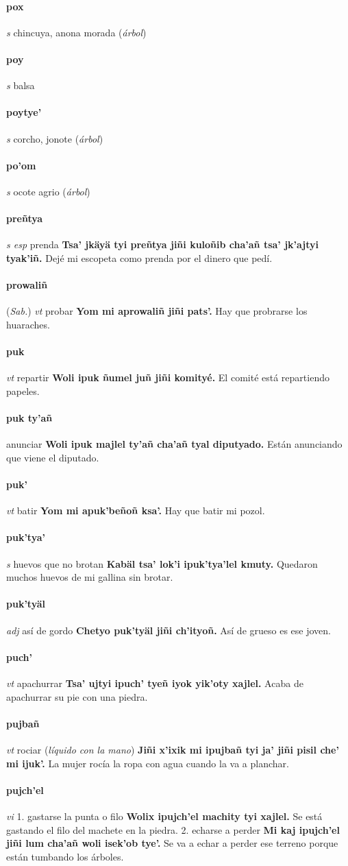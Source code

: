 \documentclass{scrbook}
\newcommand{\entry}[1]{\paragraph{#1}}
\newcommand{\onedefinition}[1]{#1.}
\newcommand{\partofspeech}[1]{\textit{#1}}
\newcommand{\spanishtranslation}[1]{#1}
\newcommand{\clarification}[1]{(\textit{#1})}
\newcommand{\cholexample}[1]{\textbf{#1}}
\newcommand{\exampletranslation}[1]{#1}
\newcommand{\relevantdialect}[1]{(\textit{#1})}
\begin{document}
\begin{multicols}{2}
\entry{pox}
\partofspeech{s}
\spanishtranslation{chincuya, anona morada}
\clarification{árbol}

\entry{poy}
\partofspeech{s}
\spanishtranslation{balsa}

\entry{poytye'}
\partofspeech{s}
\spanishtranslation{corcho, jonote}
\clarification{árbol}

\entry{po'om}
\partofspeech{s}
\spanishtranslation{ocote agrio}
\clarification{árbol}

\entry{preñtya}
\partofspeech{s esp}
\spanishtranslation{prenda}
\cholexample{Tsa' jkäyä tyi preñtya jiñi kuloñib cha'añ tsa' jk'ajtyi tyak'iñ.}
\exampletranslation{Dejé mi escopeta como prenda por el dinero que pedí.}

\entry{prowaliñ}
\relevantdialect{Sab.}
\partofspeech{vt}
\spanishtranslation{probar}
\cholexample{Yom mi aprowaliñ jiñi pats'.}
\exampletranslation{Hay que probrarse los huaraches.}

\entry{puk}
\partofspeech{vt}
\spanishtranslation{repartir}
\cholexample{Woli ipuk ñumel juñ jiñi komityé.}
\exampletranslation{El comité está repartiendo papeles.}

\entry{puk ty'añ}
\spanishtranslation{anunciar}
\cholexample{Woli ipuk majlel ty'añ cha'añ tyal diputyado.}
\exampletranslation{Están anunciando que viene el diputado.}

\entry{puk'}
\partofspeech{vt}
\spanishtranslation{batir}
\cholexample{Yom mi apuk'beñoñ ksa'.}
\exampletranslation{Hay que batir mi pozol.}

\entry{puk'tya'}
\partofspeech{s}
\spanishtranslation{huevos que no brotan}
\cholexample{Kabäl tsa' lok'i ipuk'tya'lel kmuty.}
\exampletranslation{Quedaron muchos huevos de mi gallina sin brotar.}

\entry{puk'tyäl}
\partofspeech{adj}
\spanishtranslation{así de gordo}
\cholexample{Chetyo puk'tyäl jiñi ch'ityoñ.}
\exampletranslation{Así de grueso es ese joven.}

\entry{puch'}
\partofspeech{vt}
\spanishtranslation{apachurrar}
\cholexample{Tsa' ujtyi ipuch' tyeñ iyok yik'oty xajlel.}
\exampletranslation{Acaba de apachurrar su pie con una piedra.}

\entry{pujbañ}
\partofspeech{vt}
\spanishtranslation{rociar}
\clarification{líquido con la mano}
\cholexample{Jiñi x'ixik mi ipujbañ tyi ja' jiñi pisil che' mi ijuk'.}
\exampletranslation{La mujer rocía la ropa con agua cuando la va a planchar.}

\entry{pujch'el}
\partofspeech{vi}
\onedefinition{1}
\spanishtranslation{gastarse la punta o filo}
\cholexample{Wolix ipujch'el machity tyi xajlel.}
\exampletranslation{Se está gastando el filo del machete en la piedra.}
\onedefinition{2}
\spanishtranslation{echarse a perder}
\cholexample{Mi kaj ipujch'el jiñi lum cha'añ woli isek'ob tye'.}
\exampletranslation{Se va a echar a perder ese terreno porque están tumbando los árboles.}


\end{multicols}
\end{document}
